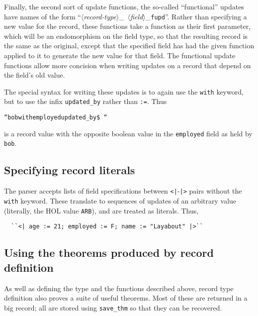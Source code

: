 \noindent Finally, the second sort of update functions, the so-called
``functional'' updates have names of the form
\mbox{``$\langle$\textsl{record-type\/}$\rangle$\_%
$\langle$\textsl{field\/}$\rangle$\_\texttt{fupd}''}. Rather than
specifying a new value for the record, these functions take a function
as their first parameter, which will be an endomorphism on the field
type, so that the resulting record is the same as the original, except
that the specified field has had the given function applied to it to
generate the new value for that field.  The functional update
functions allow more concision when writing updates on a record that
depend on the field's old value.

The special syntax for writing these updates is to again use the
\texttt{with} keyword, but to use the infix \texttt{updated\_by}
rather than \texttt{:=}.  Thus
\begin{alltt}
  ``bob with employed updated_by \$~``
\end{alltt} \noindent
is a record value with the opposite boolean value in the
\texttt{employed} field as held by \texttt{bob}.

\subsection{Specifying record literals}

The parser accepts lists of field specifications between
\texttt{<|}-\texttt{|>} pairs without the \texttt{with} keyword.
These translate to sequences of updates of an arbitrary value
(literally, the HOL value \texttt{ARB}), and are treated as literals.
Thus,
\begin{verbatim}
  ``<| age := 21; employed := F; name := "Layabout" |>``
\end{verbatim}

\subsection{Using the theorems produced by record definition}

As well as defining the type and the functions described above, record
type definition also proves a suite of useful theorems.  Most of these
are returned in a big record; all are stored using {\tt save\_thm} so
that they can be recovered.

